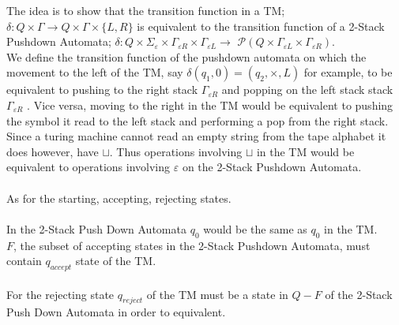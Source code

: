 \documentclass{report}
\newcommand{\me}[1]{
\begin{math}
#1
\end{math}
}
\begin{document}
The idea is to show that the transition function in a TM; \me{\delta: Q \times \Gamma \to Q \times \Gamma \times  \{L,R\}} is equivalent to the transition function of a 2-Stack Pushdown Automata; \me{\delta: Q \times \Sigma_{\varepsilon} \times \Gamma_{\varepsilon R} \times \Gamma_{\varepsilon L}  \to } $\mathcal{P}(Q \times \Gamma_{\varepsilon L}\times \Gamma_{\varepsilon R})$. \\

We define the transition function of the pushdown automata on which the movement to the left of the TM, say \me{\delta(q_1,0) = (q_2,\times,L)} for example, to be equivalent to pushing to the right stack \me{\Gamma_{\varepsilon R} } and popping on the left stack stack \me{\Gamma_{\varepsilon R} }. Vice versa, moving to the right in the TM would be equivalent to pushing the symbol it read to the left stack and performing a pop from the right stack.  Since a turing machine cannot read an empty string from the tape alphabet it does however, have $\sqcup$. Thus operations involving $\sqcup$ in the TM would be equivalent to operations involving $\varepsilon$ on the 2-Stack Pushdown Automata. \\ \\
As for the starting, accepting, rejecting states. \\ \\
In the 2-Stack Push Down Automata $q_0$ would be the same as $q_0 $ in the TM. \\
$F$, the subset of accepting states in the 2-Stack Pushdown Automata, must contain $q_{accept}$ state of the TM.\\ \\
For the rejecting state $q_{reject}$ of the TM must be a state in $Q - F$ of the 2-Stack Push Down Automata in order to equivalent.
 
 
 
 \newpage
\end{document}
